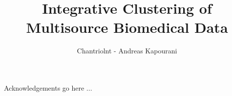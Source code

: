 \documentclass[mscres,ianc,abbrevs]{infthesis}
\title{Integrative Clustering of Multisource Biomedical Data}
\author{Chantriolnt - Andreas Kapourani}
\begin{document}
\begin{preliminary}

\maketitle

\begin{acknowledgements}
Acknowledgements go here ...
\end{acknowledgements}

\standarddeclaration


\tableofcontents

\listoffigures
\listoftables

\end{preliminary}




%
%
%
%


\appendix






\end{document}
